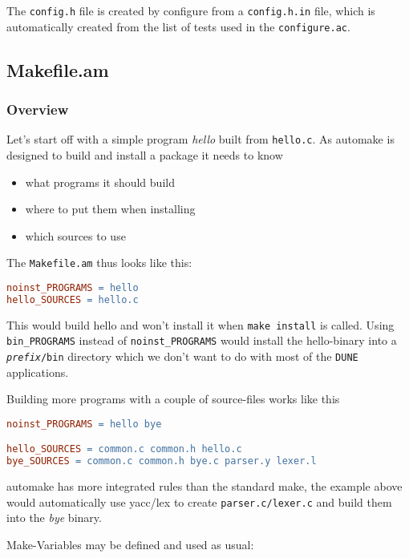 \documentclass[11pt,a4paper,headinclude,footinclude,DIV16,normalheadings]{scrartcl}
\newcommand{\dune}{\texttt{DUNE}\xspace}
\newcommand{\configureac}{\texttt{configure.ac}\xspace}
\newcommand{\makefileam}{\texttt{Makefile.am}\xspace}
\begin{document}
The \texttt{config.h} file is created by configure from a
\texttt{config.h.in} file, which is automatically created from the
list of tests used in the \configureac.

\subsection{Makefile.am}
\label{makefile.am}

\subsubsection{Overview}

Let's start off with a simple program {\em hello} built from
\texttt{hello.c}. As automake is designed to build and install a
package it needs to know

\begin{itemize}
\item what programs it should build
\item where to put them when installing
\item which sources to use
\end{itemize}

The \makefileam thus looks like this:

\begin{lstlisting}[language=make]
noinst_PROGRAMS = hello
hello_SOURCES = hello.c
\end{lstlisting}

This would build hello and won't install it when \texttt{make
  install} is called. Using \verb!bin_PROGRAMS! instead of
\verb!noinst_PROGRAMS! would install the hello-binary into a
\texttt{\textit{prefix}/bin} directory which we don't want to do with
most of the \dune applications.

Building more programs with a couple of source-files works like this

\begin{lstlisting}[language=make]
noinst_PROGRAMS = hello bye

hello_SOURCES = common.c common.h hello.c
bye_SOURCES = common.c common.h bye.c parser.y lexer.l
\end{lstlisting}

automake has more integrated rules than the standard make, the example
above would automatically use yacc/lex to create
\texttt{parser.c/lexer.c} and build them into the {\em bye} binary.

Make-Variables may be defined and used as usual:
\end{document}
